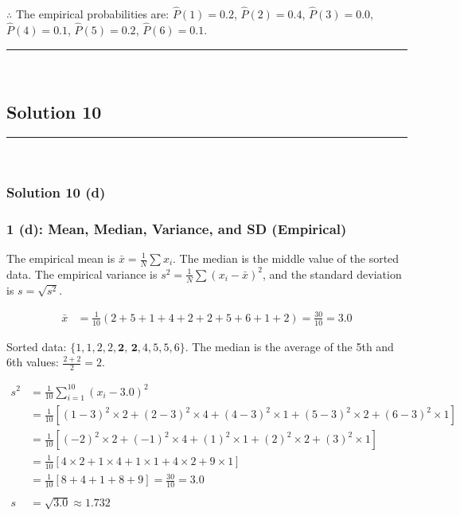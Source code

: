 \documentclass{article}
\begin{document}
\subsubsection*{\normalfont}{$\therefore$ The empirical probabilities are: $\hat{P}(1)=0.2$, $\hat{P}(2)=0.4$, $\hat{P}(3)=0.0$, $\hat{P}(4)=0.1$, $\hat{P}(5)=0.2$, $\hat{P}(6)=0.1$.}


\noindent\rule{\textwidth}{0.4pt}\\

\newpage

\subsection*{Solution 10}
\noindent\rule{\textwidth}{0.4pt}\\
\subsubsection*{Solution  10 (d)}

\subsubsection*{1 (d): Mean, Median, Variance, and SD (Empirical)}
\parbox{\textwidth}{The empirical mean is $\bar{x} = \frac{1}{N}\sum x_i$. The median is the middle value of the sorted data. The empirical variance is $s^2 = \frac{1}{N}\sum(x_i - \bar{x})^2$, and the standard deviation is $s = \sqrt{s^2}$.}
\begin{align*}
\bar{x} &= \frac{1}{10}(2+5+1+4+2+2+5+6+1+2) = \frac{30}{10} = 3.0
\end{align*}
\parbox{\textwidth}{Sorted data: $\{1, 1, 2, 2, \textbf{2, 2}, 4, 5, 5, 6\}$. The median is the average of the 5th and 6th values: $\frac{2+2}{2} = 2$.}
\begin{align*}
s^2 &= \frac{1}{10}\sum_{i=1}^{10}(x_i - 3.0)^2 \\
&= \frac{1}{10}\left[(1-3)^2 \times 2 + (2-3)^2 \times 4 + (4-3)^2 \times 1 + (5-3)^2 \times 2 + (6-3)^2 \times 1\right] \\
&= \frac{1}{10}\left[(-2)^2 \times 2 + (-1)^2 \times 4 + (1)^2 \times 1 + (2)^2 \times 2 + (3)^2 \times 1\right] \\
&= \frac{1}{10}\left[4 \times 2 + 1 \times 4 + 1 \times 1 + 4 \times 2 + 9 \times 1\right] \\
&= \frac{1}{10}\left[8 + 4 + 1 + 8 + 9\right] = \frac{30}{10} = 3.0 \\
\\
s &= \sqrt{3.0} \approx 1.732
\end{align*}
\end{document}

